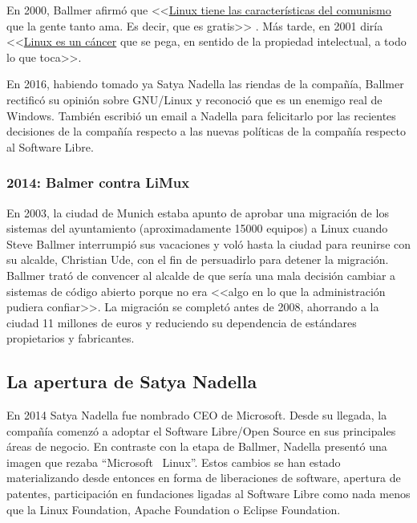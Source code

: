 En 2000, Ballmer afirmó que <<\href{https://www.theregister.co.uk/2000/07/31/ms_ballmer_linux_is_communism/}{Linux tiene las características del comunismo} que la gente tanto ama. Es decir, que es gratis>> \cite{lea_2000:ballmer_linux_comunism}. Más tarde, en 2001 diría <<\href{https://www.theregister.co.uk/2001/06/02/ballmer_linux_is_a_cancer/}{Linux es un cáncer} que se pega, en sentido de la propiedad intelectual, a todo lo que toca>>. \cite{greene_2018:ballmer_linux_cancer}

En 2016, habiendo tomado ya Satya Nadella las riendas de la compañía, Ballmer rectificó su opinión sobre GNU/Linux y reconoció que es un enemigo real de Windows. También escribió un email a Nadella para felicitarlo por las recientes decisiones de la compañía respecto a las nuevas políticas de la compañía respecto al Software Libre.\cite{tung_2016:ballmer_linux_no_more_cancer}

\subsubsection{2014: Balmer contra LiMux}
En 2003, la ciudad de Munich estaba apunto de aprobar una migración de los sistemas del ayuntamiento (aproximadamente 15000 equipos) a Linux cuando Steve Ballmer interrumpió sus vacaciones y voló hasta la ciudad para reunirse con su alcalde, Christian Ude, con el fin de persuadirlo para detener la migración. Ballmer trató de convencer al alcalde de que sería una mala decisión cambiar a sistemas de código abierto porque no era <<algo en lo que la administración pudiera confiar>>. La migración se completó antes de 2008, ahorrando a la ciudad 11 millones de euros y reduciendo su dependencia de estándares propietarios y fabricantes.\cite{munich_linux_migration}

\subsection{La apertura de Satya Nadella}
En 2014 Satya Nadella fue nombrado CEO de Microsoft. Desde su llegada, la compañía comenzó a adoptar el Software Libre/Open Source en sus principales áreas de negocio. En contraste con la etapa de Ballmer, Nadella presentó una imagen que rezaba ``Microsoft \heart\ Linux''. Estos cambios se han estado materializando desde entonces en forma de liberaciones de software, apertura de patentes, participación en fundaciones ligadas al Software Libre como nada menos que la Linux Foundation, Apache Foundation o Eclipse Foundation.


